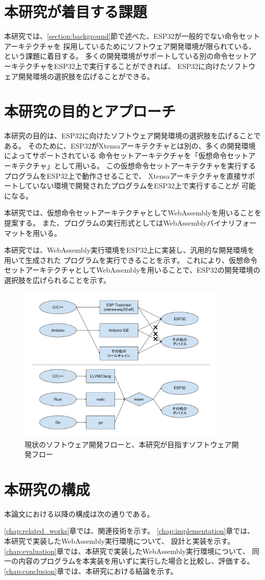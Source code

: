 \section{本研究が着目する課題}

本研究では、\ref{section:background}節で述べた、ESP32が一般的でない命令セットアーキテクチャを
採用しているためにソフトウェア開発環境が限られている、という課題に着目する。
多くの開発環境がサポートしている別の命令セットアーキテクチャをESP32上で実行することができれば、
ESP32に向けたソフトウェア開発環境の選択肢を広げることができる。

\section{本研究の目的とアプローチ}

本研究の目的は、ESP32に向けたソフトウェア開発環境の選択肢を広げることである。
そのために、ESP32がXtensaアーキテクチャとは別の、多くの開発環境によってサポートされている
命令セットアーキテクチャを「仮想命令セットアーキテクチャ」として用いる。
この仮想命令セットアーキテクチャを実行するプログラムをESP32上で動作させることで、
Xtensaアーキテクチャを直接サポートしていない環境で開発されたプログラムをESP32上で実行することが
可能になる。

本研究では、仮想命令セットアーキテクチャとしてWebAssemblyを用いることを提案する。
また、プログラムの実行形式としてはWebAssemblyバイナリフォーマットを用いる。

本研究では、WebAssembly実行環境をESP32上に実装し、汎用的な開発環境を用いて生成された
プログラムを実行できることを示す。
これにより、仮想命令セットアーキテクチャとしてWebAssemblyを用いることで、ESP32の開発環境の
選択肢を広げられることを示す。

\begin{figure}[htbp]
  \caption{現状のソフトウェア開発フローと、本研究が目指すソフトウェア開発フロー}
  \label{fig:new_world}
  \begin{center}
    \includegraphics[bb=0 0 800 600,width=10cm]{img/new_world.pdf}
  \end{center}
\end{figure}

\section{本研究の構成}

本論文における以降の構成は次の通りである。

\ref{chap:related_works}章では、関連技術を示す。
\ref{chap:implementation}章では、本研究で実装したWebAssembly実行環境について、
設計と実装を示す。
\ref{chap:evaluation}章では、本研究で実装したWebAssembly実行環境について、
同一の内容のプログラムを本実装を用いずに実行した場合と比較し、評価する。
\ref{chap:conclusion}章では、本研究における結論を示す。
